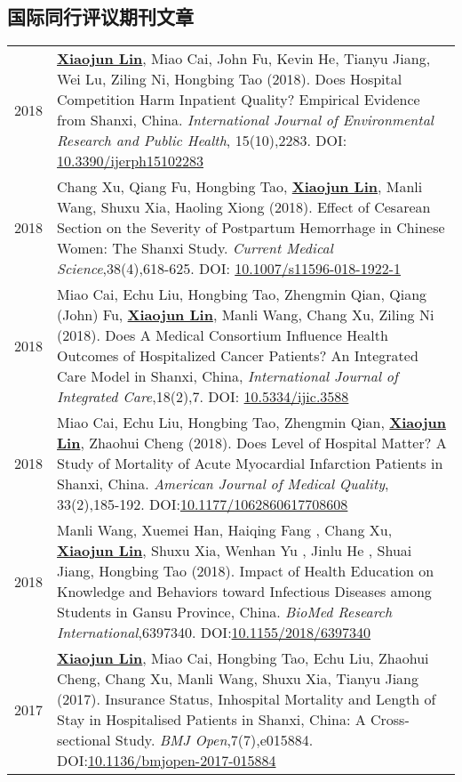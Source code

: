 \documentclass{resume}
\begin{document}
\subsection*{\textbf{国际同行评议期刊文章}}
\begin{longtable}{r p{14cm}}
2018 & \underline{\textbf{Xiaojun Lin}}, Miao Cai, John Fu, Kevin He, Tianyu Jiang, Wei Lu, Ziling Ni, Hongbing Tao (2018). Does Hospital Competition Harm Inpatient Quality? Empirical Evidence from Shanxi, China. \emph{International Journal of Environmental Research and Public Health}, 15(10),2283. DOI: \href{https://doi.org/10.3390/ijerph15102283}{10.3390/ijerph15102283}\\[5pt]

2018 & Chang Xu, Qiang Fu, Hongbing Tao, \underline{\textbf{Xiaojun Lin}}, Manli Wang, Shuxu Xia, Haoling Xiong (2018). Effect of Cesarean Section on the Severity of Postpartum Hemorrhage in Chinese Women: The Shanxi Study. \emph{Current Medical Science},38(4),618-625. DOI: \href{https://doi.org/10.1007/s11596-018-1922-1}{10.1007/s11596-018-1922-1}\\[5pt]

2018 & Miao Cai, Echu Liu, Hongbing Tao, Zhengmin Qian, Qiang (John) Fu, \underline{\textbf{Xiaojun Lin}}, Manli Wang, Chang Xu, Ziling Ni (2018). Does A Medical Consortium Influence Health Outcomes of Hospitalized Cancer Patients? An Integrated Care Model in Shanxi, China, \emph{International Journal of Integrated Care},18(2),7. DOI: \href{https://doi.org/10.5334/ijic.3588}{10.5334/ijic.3588}\\ [5pt]

2018 & Miao Cai, Echu Liu, Hongbing Tao, Zhengmin Qian, \underline{\textbf{Xiaojun Lin}}, Zhaohui Cheng (2018). Does Level of Hospital Matter? A Study of Mortality of Acute Myocardial Infarction Patients in Shanxi, China. \emph{American Journal of Medical Quality}, 33(2),185-192. DOI:\href{https://doi.org/10.1177/1062860617708608}{10.1177/1062860617708608}\\[5pt]

2018 & Manli Wang, Xuemei Han, Haiqing Fang , Chang Xu, \underline{\textbf{Xiaojun Lin}}, Shuxu Xia, Wenhan Yu , Jinlu He , Shuai Jiang, Hongbing Tao (2018). Impact of Health Education on Knowledge and Behaviors toward Infectious Diseases among Students in Gansu Province, China. \emph{BioMed Research International},6397340. DOI:\href{https://doi.org/10.1155/2018/6397340}{10.1155/2018/6397340} \\[5pt]

2017 &  \underline{\textbf{Xiaojun Lin}}, Miao Cai, Hongbing Tao, Echu Liu, Zhaohui Cheng, Chang Xu, Manli Wang, Shuxu Xia, Tianyu Jiang (2017). Insurance Status, Inhospital Mortality and Length of Stay in Hospitalised Patients in Shanxi, China: A Cross-sectional Study. \emph{BMJ Open},7(7),e015884. DOI:\href{https://doi.org/10.1136/bmjopen-2017-015884}{10.1136/bmjopen-2017-015884}\\[5pt]


\end{longtable}
\end{document}
